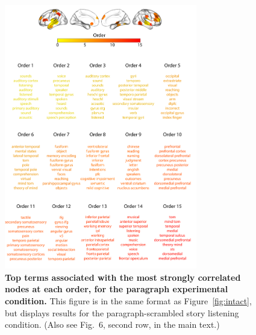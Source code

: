\documentclass[english]{article}
\newcommand{\neurosynth}{6}
\begin{document}
\begin{figure}[p!]
\centering
\includegraphics[width=0.75\textwidth]{figs/supp_15_paragraph}
\caption{\textbf{Top terms associated with the most strongly
      correlated nodes at each order, for the paragraph experimental
    condition.}  This figure is in the same format as
  Figure~\ref{fig:intact}, but displays results for the
  paragraph-scrambled story listening condition.  (Also see Fig.~\neurosynth,
second row, in the main text.)}
\label{fig:paragraph}
\end{figure}
\end{document}
